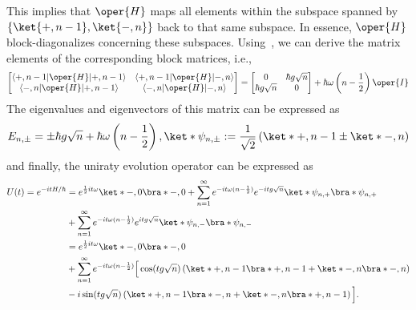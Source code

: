 This implies that \( \oper{H} \) maps all elements within the subspace spanned
by \\
\( \{ \ket{+, n - 1}, \ket{-, n} \} \) back to that same subspace.
In essence, \( \oper{H} \) block-diagonalizes concerning these subspaces. 
Using~, we can derive the matrix elements of the 
corresponding block matrices, i.e., 
\begin{equation}
\label{eq:appen_JCM_block_matrix}
\begin{bmatrix}
\langle +, n - 1 \lvert \oper{H} \lvert +, n - 1 \rangle & \langle +, n - 1 \lvert \oper{H} \lvert -, n \rangle \\
\langle -, n \lvert \oper{H} \lvert +, n - 1 \rangle & \langle -, n \lvert \oper{H} 
\lvert -, n \rangle \\
\end{bmatrix}
= 
\begin{bmatrix}
0 & \hbar g \sqrt{n} \\
\hbar g \sqrt{n} & 0 \\
\end{bmatrix}
+ \hbar \omega \left( n - \frac{1}{2} \right) \oper{I}
\end{equation}
The eigenvalues and eigenvectors of this matrix can be expressed as 
\begin{equation}
    \label{eq:appen_JCM_block_eigenvalues}
    E_{n,\pm} = \pm \hbar g \sqrt{n} + \hbar \omega \left( n - \frac{1}{2} \right),  
     \ket*{\psi_{n,\pm}} := \frac{1}{\sqrt{2}} 
     \left( \ket*{+, n - 1} \pm \ket*{-, n} \right)
\end{equation}
and finally, the uniraty evolution operator can be expressed as
\begin{align}
    U(t) = e^{-i t H/\hbar} 
    &= e^{\frac{1}{2} i t \omega } \ket*{-, 0}\bra*{-, 0} + \sum_{n=1}^{\infty} e^{-i t \omega (n - \frac{1}{2})} e^{-i t g \sqrt{n}} \ket*{\psi_{n,+}}\bra*{\psi_{n,+}} \nonumber \\
     &+ \sum_{n=1}^{\infty} e^{-i t \omega (n - \frac{1}{2})} e^{i t g \sqrt{n}} \ket*{\psi_{n,-}}\bra*{\psi_{n,-}} \nonumber \\
    &= e^{\frac{1}{2} i t \omega }\ket*{-, 0}\bra*{-, 0} \nonumber \\
     &+ \sum_{n=1}^{\infty} e^{-i t \omega (n - \frac{1}{2})} \Big[ \cos(t g \sqrt{n}) \left( \ket*{+, n - 1}\bra*{+, n - 1} + \ket*{-, n}\bra*{-, n} \right) \nonumber \\
     &- i \sin(t g \sqrt{n}) \left( \ket*{+, n - 1}\bra*{-, n} + \ket*{-, n}\bra*{+, n - 1} \right) \Big].
\end{align}
